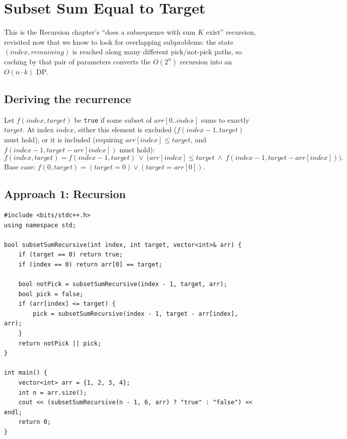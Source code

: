 \section{Subset Sum Equal to Target}
\label{sec:dp-subset-sum-target}


\begin{patternbox}
This is the Recursion chapter's ``does a
subsequence with sum $K$ exist'' recursion, revisited now that we know
to look for overlapping subproblems: the state
$(\textit{index}, \textit{remaining})$ is reached along many different
pick/not-pick paths, so caching by that pair of parameters converts the
$O(2^n)$ recursion into an $O(n \cdot k)$ DP.
\end{patternbox}

\subsection*{Deriving the recurrence}

Let $f(\textit{index}, \textit{target})$ be \texttt{true} if some subset
of $\textit{arr}[0..\textit{index}]$ sums to exactly $\textit{target}$.
At index $\textit{index}$, either this element is excluded
($f(\textit{index}-1, \textit{target})$ must hold), or it is included
(requiring $\textit{arr}[\textit{index}] \le \textit{target}$, and
$f(\textit{index}-1, \textit{target}-\textit{arr}[\textit{index}])$ must
hold):
\[
  f(\textit{index}, \textit{target}) = f(\textit{index}{-}1, \textit{target})
  \ \lor\ \big(\textit{arr}[\textit{index}] \le \textit{target} \ \land\
  f(\textit{index}{-}1, \textit{target}-\textit{arr}[\textit{index}])\big).
\]
Base case: $f(0, \textit{target}) = (\textit{target}=0) \lor
(\textit{target} = \textit{arr}[0])$.

\subsection*{Approach 1: Recursion}

\begin{lstlisting}
#include <bits/stdc++.h>
using namespace std;

bool subsetSumRecursive(int index, int target, vector<int>& arr) {
    if (target == 0) return true;
    if (index == 0) return arr[0] == target;

    bool notPick = subsetSumRecursive(index - 1, target, arr);
    bool pick = false;
    if (arr[index] <= target) {
        pick = subsetSumRecursive(index - 1, target - arr[index], arr);
    }
    return notPick || pick;
}

int main() {
    vector<int> arr = {1, 2, 3, 4};
    int n = arr.size();
    cout << (subsetSumRecursive(n - 1, 6, arr) ? "true" : "false") << endl;
    return 0;
}
\end{lstlisting}

